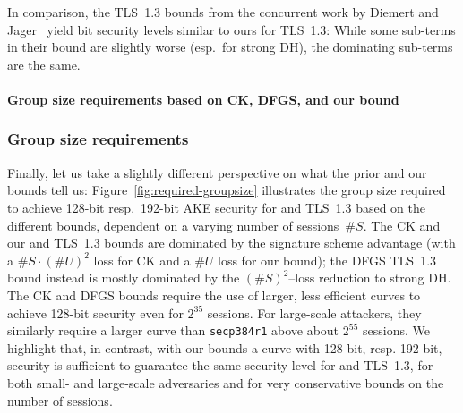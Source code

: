 In comparison, the TLS~1.3 bounds from the concurrent work by Diemert and Jager~\cite{JC:DieJag20} yield bit security levels similar to ours for TLS~1.3:
While some sub-terms in their bound are slightly worse (esp.\ for strong DH), the dominating sub-terms are the same.



\iffull
\paragraph{Group size requirements based on CK, DFGS, and our bound}
\else
\subsubsection*{Group size requirements}
\fi

Finally, let us take a slightly different perspective on what the prior and our bounds tell us:
Figure~\ref{fig:required-groupsize} illustrates the group size required to achieve 128-bit resp.\ 192-bit AKE security for \SIGMA and TLS~1.3 based on the different bounds,
dependent on a varying number of sessions~$\#S$.
The CK \SIGMA and our \SIGMA and TLS~1.3 bounds are dominated by the signature scheme advantage (with a $\#S \cdot (\#U)^2$ loss for CK and a $\#U$ loss for our bound);
the DFGS TLS~1.3 bound instead is mostly dominated by the $(\#S)^2$--loss reduction to strong DH.
The CK and DFGS bounds require the use of larger, less efficient curves to achieve 128-bit security even for $2^{35}$ sessions.
For large-scale attackers, they similarly require a larger curve than \texttt{secp384r1} above about $2^{55}$ sessions.
We highlight that, in contrast, with our bounds a curve with 128-bit, resp. 192-bit, security is sufficient to guarantee the same security level for \SIGMA and TLS~1.3, for both small- and large-scale adversaries and for very conservative bounds on the number of sessions.




